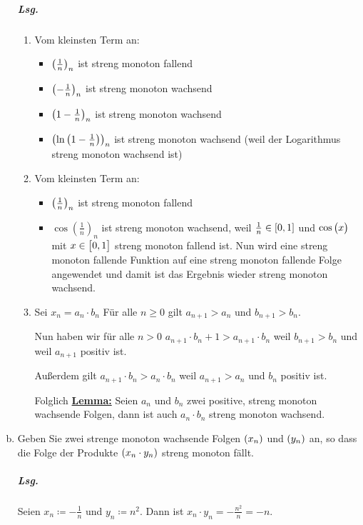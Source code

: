 \documentclass{scrreprt}
\begin{document}
\begin{enumerate}[(a)]
  \subparagraph{Lsg.}
  \begin{enumerate}[(1)]
  \item Vom kleinsten Term an:
    \begin{itemize}
    \item $\qty(\frac{1}{n})_n$ ist streng monoton fallend
    \item $\qty(-\frac{1}{n})_n$ ist streng monoton wachsend
    \item $\qty(1 - \frac{1}{n})_n$ ist streng monoton wachsend
    \item $\qty(\ln\qty(1 - \frac{1}{n}))_n$ ist streng monoton wachsend (weil
      der Logarithmus streng monoton wachsend ist)
    \end{itemize}
  \item Vom kleinsten Term an:
    \begin{itemize}
    \item $\qty(\frac{1}{n})_n$ ist streng monoton fallend
    \item $\cos(\frac{1}{n})_n$ ist streng monoton wachsend, weil
      $\frac{1}{n} \in \qty[0, 1]$ und $\cos\qty\big(x)$ mit $x \in \qty\big[0, 1]$
      streng monoton fallend ist.
      Nun wird eine streng monoton fallende Funktion auf eine streng monoton
      fallende Folge angewendet und damit ist das Ergebnis wieder streng monoton
      wachsend.
    \end{itemize}
  \item Sei $x_n = a_n \cdot b_n$
    Für alle $n \geq 0$ gilt $a_{n+1} > a_n$ und $b_{n+1} > b_n$.

    Nun haben wir für alle $n > 0$
    $a_{n + 1} \cdot b_n + 1 > a_{n + 1} \cdot b_n$ weil $b_{n + 1} > b_n$ und
    weil $a_{n + 1}$ positiv ist.

    Außerdem gilt $a_{n + 1} \cdot b_n > a_n \cdot b_n$  weil $a_{n + 1} > a_n$
    und $b_n$ positiv ist.

    Folglich \underline{\textbf{Lemma:}} Seien $a_n$ und $b_n$ zwei positive,
    streng monoton wachsende Folgen, dann ist auch $a_n \cdot b_n$ streng monoton
    wachsend.
  \end{enumerate}

\item Geben Sie zwei strenge monoton wachsende Folgen $\qty(x_n)$ und
  $\qty(y_n)$ an, so dass die Folge der Produkte $\qty(x_n \cdot y_n)$ streng
  monoton fällt.

  \subparagraph{Lsg.} Seien $x_n \coloneqq -\frac{1}{n}$ und $y_n \coloneqq n^2$.
  Dann ist $x_n \cdot y_n = -\frac{n^2}{n} = -n$.
\end{enumerate}
\end{document}
